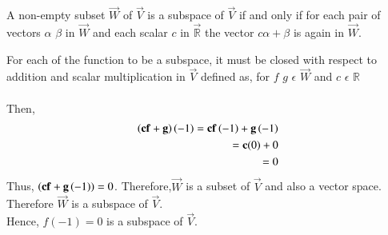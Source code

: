  A non-empty subset $\vec{W}$ of $\vec{V}$ is a subspace of $\vec{V}$ if and only if for each pair of vectors ${\alpha}$ ${\beta}$ in $\vec{W}$ and each scalar  $c$ in $\vec{\mathbb{R}}$ the vector ${{c\alpha}+{\beta}}$ is again in  $\vec{W}$.

For each of the function to be a subspace, it must be closed with respect to addition and scalar multiplication in $\vec{V}$ defined as, for $f$ $g$ $\epsilon$ $\vec{W}$ and $c$ $\epsilon$ $\mathbb{R}$
\\ \\ 
Then,
    \begin{align}
    \left(\mathbf{cf}+\mathbf{g}\right)\left(-1\right)= \mathbf{cf}\left(-1\right) + \mathbf{g}\left(-1\right)\\
    =\mathbf{c}(0)+0\\
    =0
    \end{align}
                  Thus, $\left(\mathbf{cf}+\mathbf{g}\left(-1\right)\right)=0$. Therefore,$\vec{W}$ is a subset of $\vec{V}$ and also a vector space. Therefore $\vec{W}$ is a subspace of $\vec{V}$.\\
    Hence, $f(-1) = 0$ is a subspace of $\vec{V}$.\\
